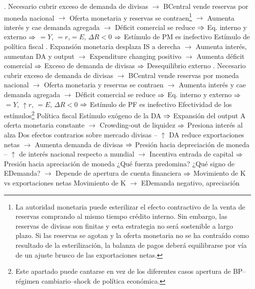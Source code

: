 \documentclass{nuevotema}
\begin{document}
\begin{esquemal}
				. Necesario cubrir exceso de demanda de divisas
				\4[] $\to$ BCentral vende reservas por moneda nacional
				\4[] $\to$ Oferta monetaria y reservas se contraen\footnote{La autoridad monetaria puede esterilizar el efecto contractivo de la venta de reservas comprando al mismo tiempo crédito interno. Sin embargo, las reservas de divisas son finitas y esta estrategia no será sostenible a largo plazo. Si las reservas se agotan y la oferta monetaria no se ha contraído como resultado de la esterilización, la balanza de pagos deberá equilibrarse por vía de un ajuste brusco de las exportaciones netas.}
				\4[] $\to$ Aumenta interés y cae demanda agregada
				\4[] $\to$ Déficit comercial se reduce
				\4[] $\Rightarrow$ Eq. interno y externo
				\4[] $\Rightarrow$ $=Y$, $=r$,$= E$, $\Delta R <0$
				\4[] $\Rightarrow$ Estímulo de PM es inefectivo
				\4[] 
				\4 Estímulo de política fiscal
				. Expansión monetaria desplaza IS a derecha
				\4[] $\to$ Aumenta interés, aumentan DA y output
				\4[] $\to$ Expenditure changing positivo
				\4[] $\to$ Aumenta déficit comercial
				\4[] $\Rightarrow$ Exceso de demanda de divisas
				\4[] $\Rightarrow$ Desequilibrio externo
				. Necesario cubrir exceso de demanda de divisas
				\4[] $\to$ BCentral vende reservas por moneda nacional
				\4[] $\to$ Oferta monetaria y reservas se contraen
				\4[] $\to$ Aumenta interés y cae demanda agregada
				\4[] $\to$ Déficit comercial se reduce
				\4[] $\Rightarrow$ Eq. interno y externo
				\4[] $\Rightarrow$ $=Y$, $\uparrow r$, $= E$, $\Delta R < 0$
				\4[] $\Rightarrow$ Estímulo de PF es inefectivo
				\4[] 
			\3 Efectividad de los estímulos\footnote{Este apartado puede cantarse en vez de los diferentes casos apertura de BP--régimen cambiario--shock de política económica.}
				\4 Política fiscal
				\4[] Estímulo exógeno de la DA
				\4[] $\Rightarrow$ Expansión del output
				\4[] A oferta monetaria constante
				\4[] $\to$ Crowding-out de liquidez
				\4[] $\Rightarrow$ Presiona interés al alza
				\4[] Dos efectos contrarios sobre mercado divisas
				\4[] -- $\uparrow$ DA reduce exportaciones netas
				\4[] $\to$ Aumenta demanda de divisas
				\4[] $\Rightarrow$ Presión hacia depreciación de moneda
				\4[] -- $\uparrow$ de interés nacional respecto a mundial
				\4[] $\to$ Incentiva entrada de capital
				\4[] $\Rightarrow$ Presión hacia apreciación de moneda
				\4[] ¿Qué fuerza predomina? ¿Qué signo de EDemanda?
				\4[] $\to$ Depende de apertura de cuenta financiera
				\4[] $\Rightarrow$ Movimiento de K vs exportaciones netas
				\4[] Movimiento de K
				\4[] $\to$ EDemanda negativo, apreciación

\end{esquemal}
\end{document}
